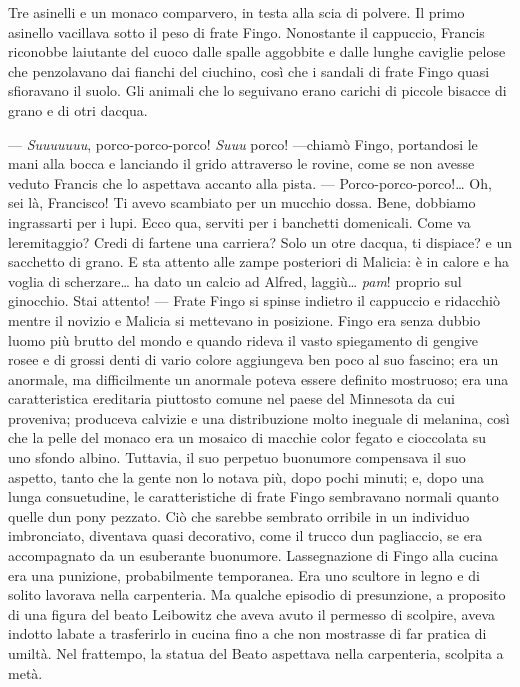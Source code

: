 Tre asinelli e un monaco comparvero, in testa alla scia di polvere. Il
primo asinello vacillava sotto il peso di frate Fingo. Nonostante il
cappuccio, Francis riconobbe l\textquotesingle aiutante del cuoco dalle
spalle aggobbite e dalle lunghe caviglie pelose che penzolavano dai
fianchi del ciuchino, così che i sandali di frate Fingo quasi sfioravano
il suolo. Gli animali che lo seguivano erano carichi di piccole bisacce
di grano e di otri d\textquotesingle acqua.

--- \emph{Suuuuuuu}, porco-porco-porco! \emph{Suuu} porco! ---chiamò
Fingo, portandosi le mani alla bocca e lanciando il grido attraverso le
rovine, come se non avesse veduto Francis che lo aspettava accanto alla
pista. --- Porco-porco-porco!\ldots{} Oh, sei là, Francisco! Ti avevo
scambiato per un mucchio d\textquotesingle ossa. Bene, dobbiamo
ingrassarti per i lupi. Ecco qua, serviti per i banchetti domenicali.
Come va l\textquotesingle eremitaggio? Credi di fartene una carriera?
Solo un otre d\textquotesingle acqua, ti dispiace? e un sacchetto di
grano. E sta\textquotesingle{} attento alle zampe posteriori di Malicia:
è in calore e ha voglia di scherzare\ldots{} ha dato un calcio ad
Alfred, laggiù\ldots{} \emph{pam}! proprio sul ginocchio. Stai attento!
--- Frate Fingo si spinse indietro il cappuccio e ridacchiò mentre il
novizio e Malicia si mettevano in posizione. Fingo era senza dubbio
l\textquotesingle uomo più brutto del mondo e quando rideva il vasto
spiegamento di gengive rosee e di grossi denti di vario colore
aggiungeva ben poco al suo fascino; era un anormale, ma difficilmente un
anormale poteva essere definito mostruoso; era una caratteristica
ereditaria piuttosto comune nel paese del Minnesota da cui proveniva;
produceva calvizie e una distribuzione molto ineguale di melanina, così
che la pelle del monaco era un mosaico di macchie color fegato e
cioccolata su uno sfondo albino. Tuttavia, il suo perpetuo buonumore
compensava il suo aspetto, tanto che la gente non lo notava più, dopo
pochi minuti; e, dopo una lunga consuetudine, le caratteristiche di
frate Fingo sembravano normali quanto quelle d\textquotesingle un pony
pezzato. Ciò che sarebbe sembrato orribile in un individuo imbronciato,
diventava quasi decorativo, come il trucco d\textquotesingle un
pagliaccio, se era accompagnato da un esuberante buonumore.
L\textquotesingle assegnazione di Fingo alla cucina era una punizione,
probabilmente temporanea. Era uno scultore in legno e di solito lavorava
nella carpenteria. Ma qualche episodio di presunzione, a proposito di
una figura del beato Leibowitz che aveva avuto il permesso di scolpire,
aveva indotto l\textquotesingle abate a trasferirlo in cucina fino a che
non mostrasse di far pratica di umiltà. Nel frattempo, la statua del
Beato aspettava nella carpenteria, scolpita a metà.

